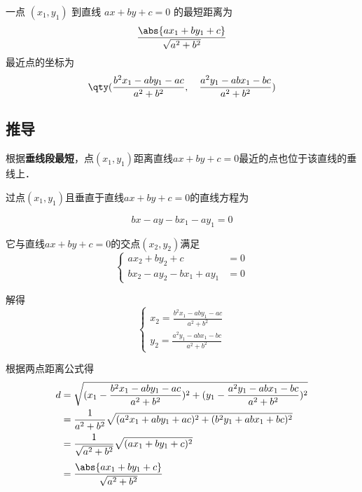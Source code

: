 
\begin{issues}
\issueDraft
\end{issues}

一点 $(x_1,y_1)$ 到直线 $ax + by + c = 0$ 的最短距离为
\begin{equation}
\frac{\abs{ax_1 + by_1 + c}}{\sqrt{a^2 + b^2}}
\end{equation}
最近点的坐标为
\begin{equation}
\qty(
\frac{b^2x_1 - aby_1 - ac}{a^2 + b^2}, \quad
\frac{a^2y_1 - abx_1 - bc}{a^2 + b^2})
\end{equation}

\subsection{推导}

根据\textbf{垂线段最短}，点$(x_1, y_1)$距离直线$ax + by + c = 0$最近的点也位于该直线的垂线上．

过点$(x_1, y_1)$且垂直于直线$ax+by+c=0$的直线方程为

\begin{equation}
bx - ay - bx_1 - ay_1 = 0
\end{equation}

它与直线$ax + by + c = 0$的交点$(x_2, y_2)$满足
\begin{equation}
\left\lbrace
\begin{aligned}
ax_2 + by_2 + c &= 0\\
bx_2 - ay_2-bx_1 + ay_1 &= 0
\end{aligned}
\right.
\end{equation}

解得
\begin{equation}
\left\lbrace
\begin{aligned}
x_2=\frac{b^2x_1 - aby_1 - ac}{a^2 + b^2}\\
y_2=\frac{a^2y_1 - abx_1 - bc}{a^2 + b^2}
\end{aligned}
\right.
\end{equation}

根据两点距离公式得
\begin{equation}
\begin{split}
d&=\sqrt{(x_1-\frac{b^2x_1 - aby_1 - ac}{a^2 + b^2})^2+(y_1-\frac{a^2y_1 - abx_1 - bc}{a^2 + b^2})^2}\\
&=\frac{1}{a^2 + b^2}\sqrt{(a^2x_1 + aby_1 + ac)^2+(b^2y_1 + abx_1 + bc)^2}\\
&=\frac{1}{\sqrt{a^2 + b^2}}\sqrt{(ax_1 + by_1 + c)^2}\\[3pt]
&=\frac{\abs{ax_1 + by_1 + c}}{\sqrt{a^2 + b^2}}\\
\end{split}
\end{equation}

